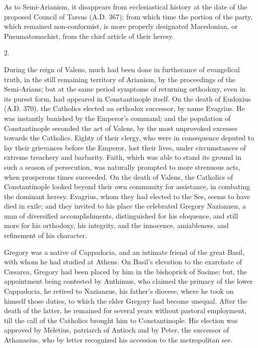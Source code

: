 As to Semi-Arianism, it disappears from ecclesiastical history at
the date of the proposed Council of Tarsus (A.D.
367); from which time the portion of the party, which remained
non-conformist, is more properly designated Macedonian, or
Pneumatomachist, from the chief article of their heresy.

2.

During the reign of Valens, much had been done in furtherance of
evangelical truth, in the still remaining territory of Arianism, by
the proceedings of the Semi-Arians; but at the same period symptoms of
returning orthodoxy, even in its purest form, had appeared in
Constantinople itself. On the death of Eudoxius (A.D.
370), the Catholics elected an orthodox successor, by name Evagrius.
He was instantly banished by the Emperor's command; and the population
of Constantinople seconded the act of Valens, by the most unprovoked excesses towards the Catholics. Eighty of their clergy, who
were in consequence deputed to lay their grievances before the
Emperor, lost their lives, under circumstances of extreme treachery
and barbarity. Faith, which was able to stand its ground in such a
season of persecution, was naturally prompted to more strenuous acts,
when prosperous times succeeded. On the death of Valens, the Catholics
of Constantinople looked beyond their own community for assistance, in
combating the dominant heresy. Evagrius, whom they had elected to the
See, seems to have died in exile; and they invited to his place the
celebrated Gregory Nazianzen, a man of diversified accomplishments,
distinguished for his eloquence, and still more for his orthodoxy, his
integrity, and the innocence, amiableness, and refinement of his
character.

Gregory was a native of Cappadocia, and an intimate friend of the
great Basil, with whom he had studied at Athens. On Basil's elevation
to the exarchate of Cæsarea, Gregory had been placed by him in the
bishoprick of Sasime; but, the appointment being contested by Anthimus,
who claimed the primacy of the lower Cappadocia, he retired to
Nazianzus, his father's diocese, where he took on himself those
duties, to which the elder Gregory had become unequal. After the death
of the latter, he remained for several years without pastoral
employment, till the call of the Catholics brought him to
Constantinople. His election was approved by Meletius, patriarch of
Antioch and by Peter, the successor of Athanasius, who by letter
recognized his accession to the metropolitan see.

